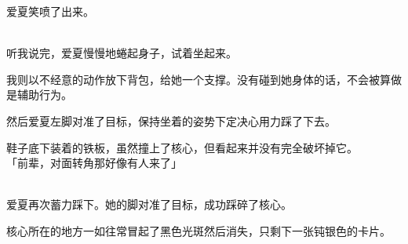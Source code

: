 爱夏笑喷了出来。\\


\\

听我说完，爱夏慢慢地蜷起身子，试着坐起来。

我则以不经意的动作放下背包，给她一个支撑。没有碰到她身体的话，不会被算做是辅助行为。

然后爱夏左脚对准了目标，保持坐着的姿势下定决心用力踩了下去。

鞋子底下装着的铁板，虽然撞上了核心，但看起来并没有完全破坏掉它。\\

「前辈，对面转角那好像有人来了」\\


\\

爱夏再次蓄力踩下。她的脚对准了目标，成功踩碎了核心。

核心所在的地方一如往常冒起了黑色光斑然后消失，只剩下一张钝银色的卡片。\\

\\

